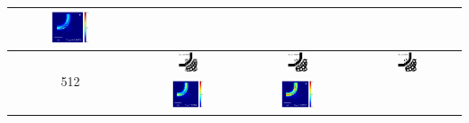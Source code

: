 \begin{table}[ht]
\begin{tabular}{|c|c|c|c|}
      \includegraphics[width=0.33\textwidth]{image/results/bend/GA/visualize_field_fab_256.png} \\
    \hline
      \multirow{2}{*}{512} &
      \includegraphics[width=0.20\textwidth]{image/results/bend/GA/visualize_eps_cont_512.png} &
      \includegraphics[width=0.20\textwidth]{image/results/bend/GA/visualize_eps_disc_512.png} &
      \includegraphics[width=0.20\textwidth]{image/results/bend/GA/visualize_eps_fab_512.png} \\
      \cline{2-4}
      &
      \includegraphics[width=0.33\textwidth]{image/results/bend/GA/visualize_field_cont_512.png} &
      \includegraphics[width=0.33\textwidth]{image/results/bend/GA/visualize_field_disc_512.png} &

\end{tabular}
\end{table}
